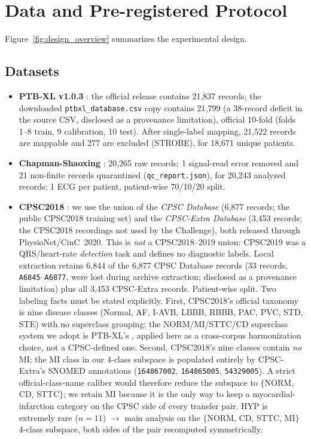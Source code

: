 \documentclass[review,12pt,nonatbib]{elsarticle}
\begin{document}
\section{Data and Pre-registered Protocol}
\label{sec:data}
Figure~\ref{fig:design_overview} summarizes the experimental design.
\subsection{Datasets}
\begin{itemize}
    \item \textbf{PTB-XL v1.0.3} \cite{wagner2020ptbxl}: the official release contains 21,837
    records; the downloaded \texttt{ptbxl\_database.csv} copy contains 21,799
    (a 38-record deficit in the source CSV, disclosed as a provenance
    limitation), official 10-fold
    (folds 1--8 train, 9 calibration, 10 test). After
    single-label mapping, 21,522 records are mappable and 277 are
    excluded (STROBE), for 18,671 unique patients.
    \item \textbf{Chapman-Shaoxing} \cite{zheng2022ecgarrhythmia,goldberger2000}: 20,265
    raw records; 1 signal-read error removed and 21 non-finite records
    quarantined (\texttt{qc\_report.json}), for 20,243 analyzed records;
    1 ECG per patient, patient-wise 70/10/20 split.
    \item \textbf{CPSC2018} \cite{liu2018cpsc,physionet2020cpsc}: we use the union
    of the \emph{CPSC Database} (6,877 records; the public CPSC2018 training
    set) and the \emph{CPSC-Extra Database} (3,453 records; the CPSC2018
    recordings not used by the Challenge), both released through
    PhysioNet/CinC~2020. This is \emph{not} a CPSC2018--2019 union: CPSC2019
    was a QRS/heart-rate \emph{detection} task and defines no diagnostic
    labels. Local extraction retains 6,844 of the 6,877 CPSC Database records
    (33 records, \texttt{A6845}--\texttt{A6877}, were lost during archive
    extraction; disclosed as a provenance limitation) plus all 3,453
    CPSC-Extra records. Patient-wise split. Two labeling facts must be stated
    explicitly. First, CPSC2018's official taxonomy is nine disease classes
    (Normal, AF, I-AVB, LBBB, RBBB, PAC, PVC, STD, STE) with no superclass
    grouping; the NORM\slash MI\slash STTC\slash CD superclass system we adopt
    is PTB-XL's \cite{wagner2020ptbxl}, applied here as a cross-corpus
    harmonization choice, not a CPSC-defined one. Second, CPSC2018's nine
    classes contain \emph{no} MI; the MI class in our 4-class subspace is
    populated entirely by CPSC-Extra's SNOMED annotations (\texttt{164867002},
    \texttt{164865005}, \texttt{54329005}). A strict official-class-name
    caliber would therefore reduce the subspace to $\{$NORM, CD, STTC$\}$; we
    retain MI because it is the only way to keep a myocardial-infarction
    category on the CPSC side of every transfer pair. HYP is extremely rare
    ($n=11$) $\rightarrow$ main analysis on the $\{$NORM, CD, STTC, MI$\}$
    4-class subspace, both sides of the pair recomputed symmetrically.
\end{itemize}
\end{document}
